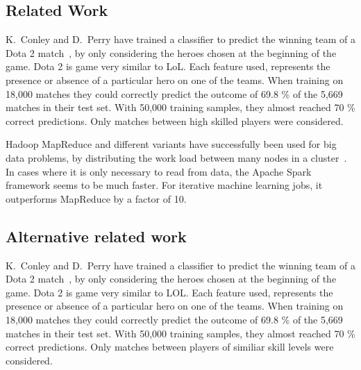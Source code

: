 \subsection{Related Work}\label{sec:relatedwork}

K.\ Conley and D.\ Perry have trained a classifier to predict the winning team of a Dota 2 match~\cite{dota2article}, by only considering the heroes chosen at the beginning of the game. Dota 2 is game very similar to LoL.\@
Each feature used, represents the presence or absence of a particular hero on one of the teams.
When training on 18,000 matches they could correctly predict the outcome of 69.8 \% of the 5,669 matches in their test set.
With 50,000 training samples, they almost reached 70 \% correct predictions. Only matches between high skilled players were considered.



Hadoop MapReduce and different variants have successfully been used for big data problems, by distributing the work load between many nodes in a cluster~\cite{ApacheSpark}.
In cases where it is only necessary to read from data, the Apache Spark framework seems to be much faster.
For iterative machine learning jobs, it outperforms MapReduce by a factor of 10.

\subsection{Alternative related work}
K.\ Conley and D.\ Perry have trained a classifier to predict the winning team of a Dota 2 match~\cite{dota2article}, by only considering the heroes chosen at the beginning of the game. Dota 2 is game very similar to LOL.\@
Each feature used, represents the presence or absence of a particular hero on one of the teams.
When training on 18,000 matches they could correctly predict the outcome of 69.8 \% of the 5,669 matches in their test set.
With 50,000 training samples, they almost reached 70 \% correct predictions. Only matches between players of similiar skill levels were considered.


